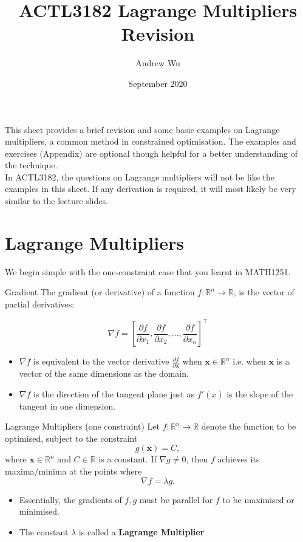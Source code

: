 \documentclass[11pt]{article}
\title{\textbf{ACTL3182 Lagrange Multipliers Revision}}
\author{Andrew Wu}
\date{September 2020}
\newcommand{\R}{\mathbb{R}}
\newcommand{\vx}{\bm{x}}
\begin{document}
	\maketitle
	\noindent This sheet provides a brief revision and some basic examples on Lagrange multipliers, a common method in constrained optimisation. The examples and exercises (Appendix) are optional though helpful for a better understanding of the technique.\\ In ACTL3182, the questions on Lagrange multipliers will not be like the examples in this sheet. If any derivation is required, it will most likely be very similar to the lecture slides.
	
	\section{Lagrange Multipliers}
	We begin simple with the one-constraint case that you learnt in MATH1251.
	\begin{definition}{Gradient}{}
		The gradient (or derivative) of a function \( f:\R^{n}\to\R \), is the vector of partial derivatives:

		\[	\nabla f =		\left[\frac{\partial f}{\partial x_1}  , \frac{\partial f}{\partial x_2} , ... , \frac{\partial f}{\partial x_n}\right]^{\top}				
			\]
		\tcblower
		\begin{itemize}
			\item \( \nabla f \) is equivalent to the vector derivative \( \frac{\partial f}{\partial \bm{x}} \) when \( \vx\in\R^n \) i.e. when \( \vx \) is a vector of the same dimensions as the domain.
			\item \( \nabla f \) is the direction of the tangent plane just as \( f'(x) \) is the slope of the tangent in one dimension.
		\end{itemize}
	\end{definition}
	\bigskip
	\noindent 
	\begin{theorem}{Lagrange Multipliers (one constraint)}{}
		Let \( f:\R^n \to\R \) denote the function to be optimised, subject to the constraint 
		\[	g(\vx) = C, \]
		where \( \vx\in\R^n \)	and \( C\in\R \) is a constant. If \( \nabla g \neq 0 \), then \( f \) achieves its maxima/minima at the points where 
		\[	\nabla f = \lambda g.\]
		\tcblower
		\begin{itemize}
			\item Essentially, the gradients of \( f,g \) must be parallel for \( f \) to be maximised or minimised.
			\item The constant \( \lambda \) is called a \textbf{Lagrange Multiplier}
		\end{itemize} 
	\end{theorem}
\end{document}
